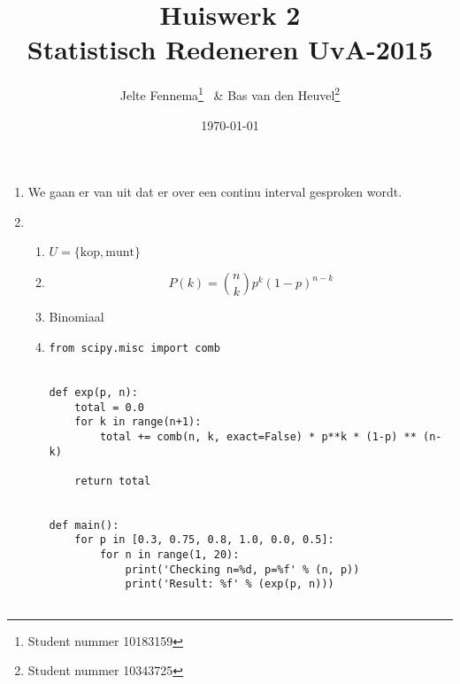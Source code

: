 \documentclass{article}
\title{Huiswerk 2\\ \large{Statistisch Redeneren UvA-2015}}
\author{Jelte Fennema\thanks{Student nummer 10183159} ~\& Bas van den
Heuvel\thanks{Student nummer 10343725}}
\date{\today}
\begin{document}
\maketitle

\begin{enumerate}
    \item We gaan er van uit dat er over een continu interval gesproken wordt.

    \item
        \begin{enumerate}
                \newcommand{\kop}{\text{kop}}
                \newcommand{\munt}{\text{munt}}
            \item
                $U = \{\kop, \munt\}$

            \item
                $$
                P(k)= \left. n\choose k\right. p^k(1-p)^{n-k}
                $$

            \item Binomiaal

            \item
                \begin{verbatim}
from scipy.misc import comb


def exp(p, n):
    total = 0.0
    for k in range(n+1):
        total += comb(n, k, exact=False) * p**k * (1-p) ** (n-k)

    return total


def main():
    for p in [0.3, 0.75, 0.8, 1.0, 0.0, 0.5]:
        for n in range(1, 20):
            print('Checking n=%d, p=%f' % (n, p))
            print('Result: %f' % (exp(p, n)))


\end{verbatim}
\end{enumerate}
\end{enumerate}
\end{document}
